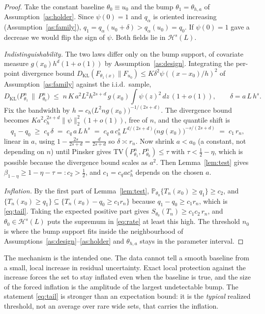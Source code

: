 \documentclass[11pt]{article}
\theoremstyle{definition}
\theoremstyle{remark}
\newcommand{\Prob}{\mathbb{P}}
\newcommand{\KL}{D_{\mathrm{KL}}}
\newcommand{\TV}{\mathrm{TV}}
\newcommand{\Hs}[1][s]{\mathcal{H}^{#1}}
\begin{document}
\begin{proof}
Take the constant baseline $\theta_0 \equiv u_0$ and the bump $\theta_1=\theta_{h,a}$ of
Assumption~\ref{as:holder}. Since $\psi(0)=1$ and $q_\alpha$ is oriented increasing
(Assumption~\ref{as:family}), $q_1=q_\alpha(u_0+\delta)>q_\alpha(u_0)=q_0$. If $\psi(0)=1$
gave a decrease we would flip the sign of $\psi$. Both fields lie in $\Hs(L)$.

\emph{Indistinguishability.} The two laws differ only on the bump support, of covariate
measure $g(x_0)h^{d}(1+o(1))$ by Assumption~\ref{as:design}. Integrating the per-point
divergence bound $\KL(F_{\theta_1(x)}\|F_{u_0})\le K\delta^2\psi((x-x_0)/h)^2$ of
Assumption~\ref{as:family} against the i.i.d.\ sample,
\[
  \KL\big(P^{n}_{\theta_1} \,\|\, P^{n}_{\theta_0}\big)
  \;\le\; n\,K\,a^2 L^2 h^{2s+d}\,g(x_0)\!\int\!\psi(z)^2\,dz\,(1+o(1)),
  \qquad \delta = a\,L\,h^{s}.
\]
Fix the bandwidth by $h = c_h\big(L^2 n g(x_0)\big)^{-1/(2s+d)}$. The divergence bound
becomes $K a^2 c_h^{2s+d}\|\psi\|_2^2(1+o(1))$, free of $n$, and the quantile shift is
\[
  q_1 - q_0 \;\ge\; c_q\,\delta \;=\; c_q\,a\,L\,h^{s}
    \;=\; c_q\,a\,c_h^{s}\,L^{d/(2s+d)}\big(n g(x_0)\big)^{-s/(2s+d)}
    \;=\; c_1\,r_n ,
\]
linear in $a$, using $1-\tfrac{2s}{2s+d}=\tfrac{d}{2s+d}$ so $\delta\asymp r_n$. Now shrink
$a<a_0$ (a constant, not depending on $n$) until Pinsker gives
$\TV(P^{n}_{\theta_1},P^{n}_{\theta_0}) \le \tau$ with $\tau < \tfrac12 - \eta$, which is
possible because the divergence bound scales as $a^2$. Then Lemma~\ref{lem:test} gives
$\beta_{1-\eta} \ge 1-\eta-\tau =: c_2 > \tfrac12$, and $c_1 = c_q a c_h^s$ depends on the
chosen $a$.

\emph{Inflation.} By the first part of Lemma~\ref{lem:test},
$\Prob_{\theta_0}\{T_n(x_0)\ge q_1\}\ge c_2$, and $\{T_n(x_0)\ge q_1\} \subseteq
\{T_n(x_0)-q_0\ge c_1 r_n\}$ because $q_1-q_0\ge c_1 r_n$, which is \eqref{eq:tail}. Taking
the expected positive part gives $S_{\theta_0}(T_n)\ge c_1 c_2\, r_n$, and
$\theta_0\in\Hs(L)$ puts the supremum in \eqref{eq:rate} at least this high. The threshold
$n_0$ is where the bump support fits inside the neighbourhood of
Assumptions~\ref{as:design}--\ref{as:holder} and $\theta_{h,a}$ stays in the parameter
interval.
\end{proof}

The mechanism is the intended one. The data cannot tell a smooth baseline from a small,
local increase in residual uncertainty. Exact local protection against the increase forces
the set to stay inflated even when the baseline is true, and the size of the forced
inflation is the amplitude of the largest undetectable bump. The statement \eqref{eq:tail}
is stronger than an expectation bound: it is the \emph{typical} realized threshold, not an
average over rare wide sets, that carries the inflation.
\end{document}
